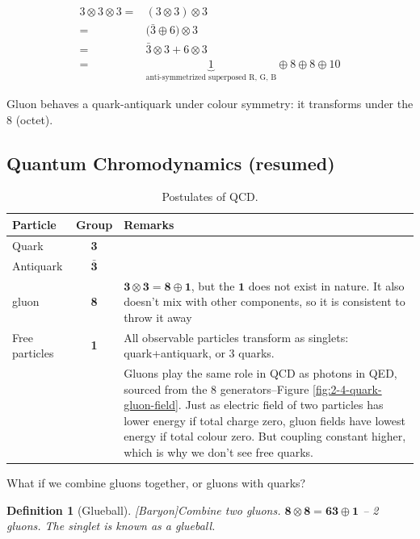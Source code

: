\documentclass[]{article}
\newtheorem{defn}[thm]{Definition}
\begin{document}
\begin{align*}
3 \otimes 3 \otimes 3 =& (3 \otimes 3) \otimes 3\\
=& \big(\bar{3} \oplus 6 \big) \otimes 3\\
=& \bar{3}   \otimes 3 + 6 \otimes 3\\
=& \underbrace{1}_\text{anti-symmetrized superposed R, G, B} \oplus 8 \oplus 8 \oplus 10
\end{align*}

Gluon behaves a quark-antiquark under colour symmetry: it transforms under the 8 (octet).

\subsection{Quantum Chromodynamics (resumed)}

\begin{table}[H]
	\begin{center}
		\caption{Postulates of QCD.}\label{table:postulates:QCD}
		\begin{tabular}{|l|c|p{8cm}|} \hline
			Particle&Group&Remarks \\ \hline
			Quark&{\bfseries 3}& \\ \hline
			Antiquark&$\bm{\bar{3}}$& \\ \hline
			gluon&{\bfseries 8}&$\bm{3}\otimes\bm{3}=\bm{8}\oplus\bm{1}$, but the $\bm{1}$ does not exist in nature. It also doesn't mix with other components, so it is consistent to throw it away \\ \hline
			Free particles&{\bfseries 1}&All observable particles transform as singlets: quark+antiquark, or 3 quarks.\\ \hline
			&&Gluons play the same role in QCD as photons in QED, sourced from the 8 generators--Figure \ref{fig:2-4-quark-gluon-field}. Just as electric field of two particles has lower energy if total charge zero, gluon fields have lowest energy if total colour zero. But coupling constant higher, which is why we don't see free quarks.\\ \hline
		\end{tabular}
	\end{center}
\end{table}

What if we combine gluons together, or gluons with quarks?

\begin{defn}[Glueball][Baryon]\label{defn:glueball}
	Combine two gluons. $\bm{8} \otimes \bm{8} = \bm{63} \oplus \bm{1}$ -- 2 gluons. The singlet is known as a glueball.
\end{defn}
\end{document}
